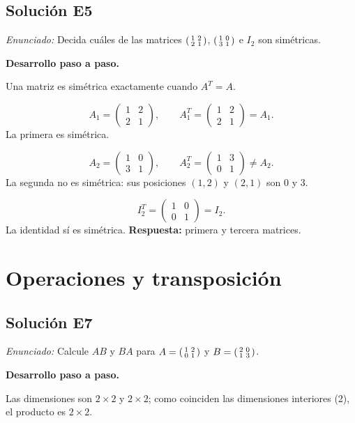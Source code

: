 \documentclass[12pt]{article}
\theoremstyle{remark}
\newcommand{\solucion}[2]{\Needspace{11\baselineskip}\subsection*{Solución E#1}\noindent\textit{Enunciado:} #2\par\medskip\noindent\textbf{Desarrollo paso a paso.}\par\medskip}
\begin{document}
\medskip

\solucion{5}{Decida cuáles de las matrices $\begin{psmallmatrix}1&2\\2&1\end{psmallmatrix}$, $\begin{psmallmatrix}1&0\\3&1\end{psmallmatrix}$ e $I_2$ son simétricas.}
Una matriz es simétrica exactamente cuando $A^T=A$.

\[
A_1=\begin{pmatrix}1&2\\2&1\end{pmatrix},\qquad A_1^T=\begin{pmatrix}1&2\\2&1\end{pmatrix}=A_1.
\]
La primera es simétrica.

\[
A_2=\begin{pmatrix}1&0\\3&1\end{pmatrix},\qquad A_2^T=\begin{pmatrix}1&3\\0&1\end{pmatrix}\ne A_2.
\]
La segunda no es simétrica: sus posiciones $(1,2)$ y $(2,1)$ son $0$ y $3$.

\[
I_2^T=\begin{pmatrix}1&0\\0&1\end{pmatrix}=I_2.
\]
La identidad sí es simétrica. \textbf{Respuesta:} primera y tercera matrices.


\medskip

\section{Operaciones y transposición}

\solucion{7}{Calcule $AB$ y $BA$ para $A=\begin{psmallmatrix}1&2\\0&1\end{psmallmatrix}$ y $B=\begin{psmallmatrix}2&0\\1&3\end{psmallmatrix}$.}
Las dimensiones son $2\times2$ y $2\times2$; como coinciden las dimensiones interiores (2), el producto es $2\times2$.
\end{document}
